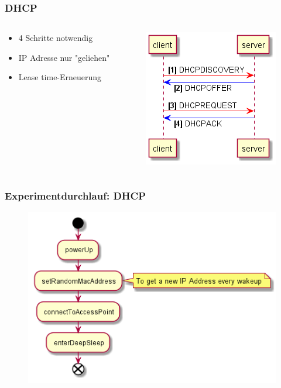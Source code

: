 \begin{frame}
    \frametitle{DHCP}
    \begin{columns}
        \begin{column}{0.5\textwidth}
            \begin{itemize}
                \item 4 Schritte notwendig
                \item IP Adresse nur "geliehen"
                \item Lease time-Erneuerung

            \end{itemize}
        \end{column}
        \begin{column}{0.5\textwidth}
            \begin{figure}
                \includegraphics[scale=0.7]{../paper/fig/sequence_DHCP_connection.png}
            \end{figure}
        \end{column}
    \end{columns}
\end{frame}

\begin{frame}
    \frametitle{Experimentdurchlauf: DHCP}
    \begin{figure}
        \includegraphics[scale=0.6]{../paper/fig/sequence_DHCP.png}
    \end{figure}
\end{frame}

